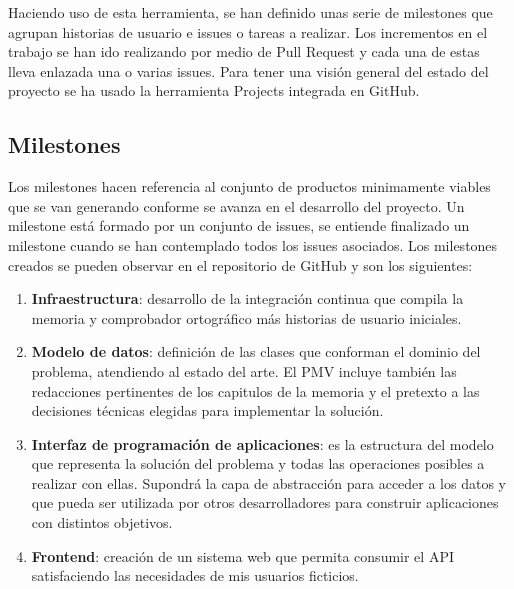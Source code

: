 Haciendo uso de esta herramienta, se han definido unas serie de milestones que agrupan historias de usuario e issues o tareas a realizar. Los
incrementos en el trabajo se han ido realizando por medio de Pull Request y cada una de estas lleva enlazada una o varias
issues. Para tener una visión general del estado del proyecto se ha usado la herramienta Projects integrada en GitHub.

\subsection{Milestones}
Los milestones hacen referencia al conjunto de productos minimamente viables que se van generando conforme se avanza en el
desarrollo del proyecto. Un milestone está formado por un conjunto de issues, se entiende finalizado un milestone cuando se
han contemplado todos los issues asociados. Los milestones creados se pueden observar en el repositorio de GitHub y son los siguientes:
\begin{enumerate}
    \item \textbf{Infraestructura}: desarrollo de la integración continua que compila la memoria y comprobador ortográfico más
    historias de usuario iniciales.
    \item \textbf{Modelo de datos}: definición de las clases que conforman el dominio del problema, atendiendo al estado
    del arte. El PMV incluye también las redacciones pertinentes de los capitulos de la memoria y el pretexto a las decisiones
    técnicas elegidas para implementar la solución.
    \item \textbf{Interfaz de programación de aplicaciones}: es la estructura del modelo que representa la solución del problema
    y todas las operaciones posibles a realizar con ellas. Supondrá la capa de abstracción para acceder a los datos y que pueda
    ser utilizada por otros desarrolladores para construir aplicaciones con distintos objetivos.
    \item \textbf{Frontend}: creación de un sistema web que permita consumir el API satisfaciendo las necesidades de mis usuarios ficticios.
\end{enumerate}

